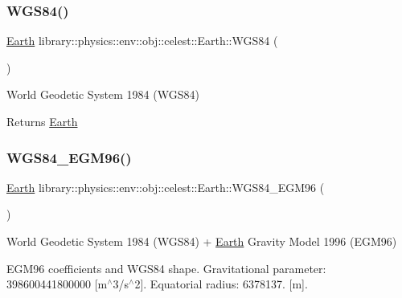 \subsubsection{\texorpdfstring{W\+G\+S84()}{WGS84()}}
{\footnotesize\ttfamily \hyperlink{classlibrary_1_1physics_1_1env_1_1obj_1_1celest_1_1_earth}{Earth} library\+::physics\+::env\+::obj\+::celest\+::\+Earth\+::\+W\+G\+S84 (\begin{DoxyParamCaption}{ }\end{DoxyParamCaption})\hspace{0.3cm}{\ttfamily [static]}}



World Geodetic System 1984 (W\+G\+S84) 

\begin{DoxyReturn}{Returns}
\hyperlink{classlibrary_1_1physics_1_1env_1_1obj_1_1celest_1_1_earth}{Earth} 
\end{DoxyReturn}
\mbox{\label{classlibrary_1_1physics_1_1env_1_1obj_1_1celest_1_1_earth_ace43736c4101b542e7e1e2dec090274c}} 
\subsubsection{\texorpdfstring{W\+G\+S84\+\_\+\+E\+G\+M96()}{WGS84\_EGM96()}}
{\footnotesize\ttfamily \hyperlink{classlibrary_1_1physics_1_1env_1_1obj_1_1celest_1_1_earth}{Earth} library\+::physics\+::env\+::obj\+::celest\+::\+Earth\+::\+W\+G\+S84\+\_\+\+E\+G\+M96 (\begin{DoxyParamCaption}{ }\end{DoxyParamCaption})\hspace{0.3cm}{\ttfamily [static]}}



World Geodetic System 1984 (W\+G\+S84) + \hyperlink{classlibrary_1_1physics_1_1env_1_1obj_1_1celest_1_1_earth}{Earth} Gravity Model 1996 (E\+G\+M96) 

E\+G\+M96 coefficients and W\+G\+S84 shape. Gravitational parameter\+: 398600441800000 \mbox{[}m$^\wedge$3/s$^\wedge$2\mbox{]}. Equatorial radius\+: 6378137. \mbox{[}m\mbox{]}.

